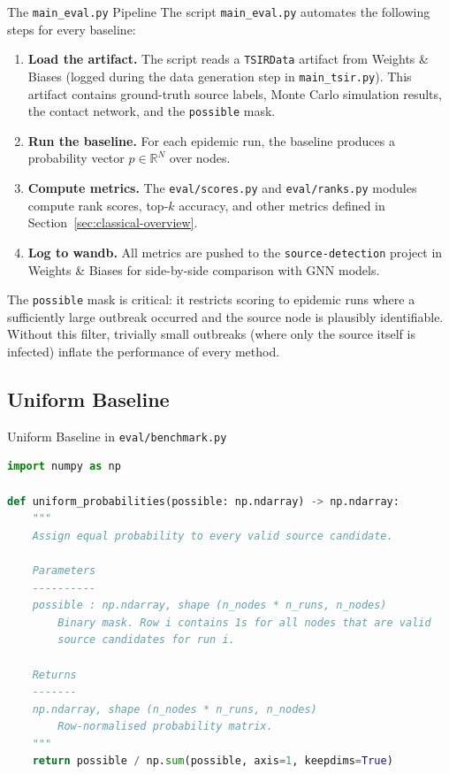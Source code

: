 \begin{conceptbox}{The \texttt{main\_eval.py} Pipeline}
The script \texttt{main\_eval.py} automates the following steps for every baseline:

\begin{enumerate}
  \item \textbf{Load the artifact.} The script reads a \texttt{TSIRData} artifact from
        Weights \& Biases (logged during the data generation step in
        \texttt{main\_tsir.py}). This artifact contains ground-truth source labels,
        Monte Carlo simulation results, the contact network, and the \texttt{possible}
        mask.

  \item \textbf{Run the baseline.} For each epidemic run, the baseline produces a
        probability vector $p \in \mathbb{R}^N$ over nodes.

  \item \textbf{Compute metrics.} The \texttt{eval/scores.py} and
        \texttt{eval/ranks.py} modules compute rank scores, top-$k$ accuracy, and
        other metrics defined in Section~\ref{sec:classical-overview}.

  \item \textbf{Log to wandb.} All metrics are pushed to the
        \texttt{source-detection} project in Weights \& Biases for side-by-side
        comparison with GNN models.
\end{enumerate}

The \texttt{possible} mask is critical: it restricts scoring to epidemic runs where
a sufficiently large outbreak occurred and the source node is plausibly identifiable.
Without this filter, trivially small outbreaks (where only the source itself is
infected) inflate the performance of every method.
\end{conceptbox}

\subsection{Uniform Baseline}

\begin{codewalk}{Uniform Baseline in \texttt{eval/benchmark.py}}
\begin{lstlisting}[language=Python]
import numpy as np

def uniform_probabilities(possible: np.ndarray) -> np.ndarray:
    """
    Assign equal probability to every valid source candidate.

    Parameters
    ----------
    possible : np.ndarray, shape (n_nodes * n_runs, n_nodes)
        Binary mask. Row i contains 1s for all nodes that are valid
        source candidates for run i.

    Returns
    -------
    np.ndarray, shape (n_nodes * n_runs, n_nodes)
        Row-normalised probability matrix.
    """
    return possible / np.sum(possible, axis=1, keepdims=True)
\end{lstlisting}
\end{codewalk}

